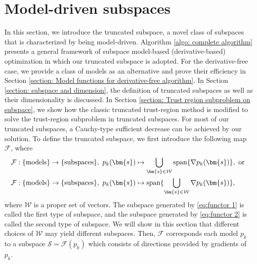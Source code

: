 \documentclass[colorlinks=true, linkcolor=blue, citecolor=blue, urlcolor=blue]{article}
\theoremstyle{plain}
\theoremstyle{definition}
\theoremstyle{remark}
\begin{document}
\section{Model-driven subspaces}
In this section, we introduce the truncated subspace, a novel class of subspaces that is characterized by being model-driven. Algorithm \ref{algo: complete algorithm} presents a general framework of subspace model-based (derivative-based) optimization in which our truncated subspace is adopted. For the derivative-free case, we provide a class of models as an alternative and prove their efficiency in Section \ref{section: Model functions for derivative-free algorithm}. In Section \ref{section: subspace and dimension}, the definition of truncated subspaces as well as their dimensionality is discussed. In Section \ref{section: Trust region subproblem on subspace}, we show how the classic truncated trust-region method is modified to solve the trust-region subproblem in truncated subspaces. For most of our truncated subspaces, a Cauchy-type sufficient decrease can be achieved by our solution.
To define the truncated subspace, we first introduce the following map $\mathcal{F}$, where 
    \begin{align}
        \mathcal{F}&:\{\text{models}\}\to\{\text{subspaces}\},\ p_k(\bm{s})\mapsto \bigcup\limits_{\bm{s}\in\mathcal{W}}{\rm span}\{\nabla p_k(\bm{s})\},\text{ or }\label{eq:functor 1}\\
        \mathcal{F}&:\{\text{models}\}\to\{\text{subspaces}\},\ p_k(\bm{s})\mapsto {\rm span}\{\bigcup\limits_{\bm{s}\in\mathcal{W}}\nabla p_k(\bm{s})\},\label{eq:functor 2}
    \end{align}
where $\mathcal{W}$ is a proper set of vectors. The subspace generated by \eqref{eq:functor 1} is called the first type of subspace, and the subspace generated by \eqref{eq:functor 2} is called the second type of subspace.
We will show in this section that different choices of $\mathcal{W}$ may yield different subspaces. Then, $\mathcal{F}$ corresponds each model $p_k$ to a subspace $\mathcal{S}=\mathcal{F}(p_k)$ which consists of directions provided by gradients of $p_k$. 
\end{document}
